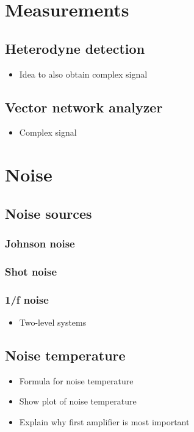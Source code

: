 \documentclass[12pt]{report}
\begin{document}
\chapter{Measurements}

\section{Heterodyne detection}
\begin{itemize}
    \item Idea to also obtain complex signal
\end{itemize}

\section{Vector network analyzer}
\begin{itemize}
    \item Complex signal
\end{itemize}




















\chapter{Noise}

\section{Noise sources}

\subsection{Johnson noise}

\subsection{Shot noise}

\subsection{1/f noise}
\begin{itemize}
    \item Two-level systems
\end{itemize}


\section{Noise temperature}

\begin{itemize}
    \item Formula for noise temperature
    \item Show plot of noise temperature
    \item Explain why first amplifier is most important
\end{itemize}



\end{document}
